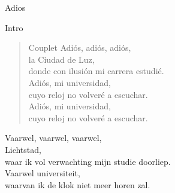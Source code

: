 \begin{song}[tango]{Adios}

\begin{instrumental}{Intro}
 \measure{} \measure{} \measure{}  \measure{}    \measure{}  \measure{}  \measure{}  \measure*{}
\end{instrumental}


\begin{verse}{Couplet}
Adiós, adiós, adiós,\\
\chord{}la Ciudad de Luz,\\
donde con ilusión mi carrera estudié.\\
Adiós, mi universidad,\\
cuyo reloj no volveré a escuchar.\\
Adiós, mi universidad,\\
cuyo reloj no volveré a escuchar.\\
\end{verse}
\repetition{[Fonseca]}
\end{song}
\begin{translation}
Vaarwel, vaarwel, vaarwel,\\
Lichtstad,\\
waar ik vol verwachting mijn studie doorliep.\\
Vaarwel universiteit,\\
waarvan ik de klok niet meer horen zal.\\
\end{translation}

\clearpage